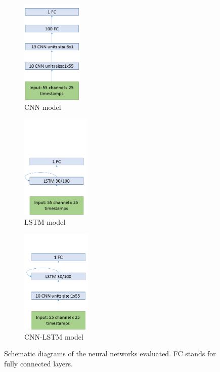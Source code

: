 \documentclass[
12pt, %
english, %
doublespacing, %
headsepline, %
]{MastersDoctoralThesis} %
\begin{document}
	\begin{figure}[t]
		\centering
		\begin{minipage}{.3\textwidth}
			\centering
			\begin{subfigure}{1.0\textwidth}
				\centering
				\includegraphics[height=5cm]{P300_CNN_arch}
				\caption{CNN model}
				\label{fig:CNN_model}
			\end{subfigure}
		\end{minipage}	
		\begin{minipage}{.3\textwidth}
			
			\centering
			\begin{subfigure}{1.0\textwidth}
				\centering
				\includegraphics[height=5cm]{P300_LSTM_arch_v3}
				\caption{LSTM model}
				\label{fig:LSTM_model}
			\end{subfigure}
			
		\end{minipage}%
		\begin{minipage}{.3\textwidth}
			\centering
			\begin{subfigure}{1.0\textwidth}
			\centering
			\includegraphics[height=5cm]{P300_LSTM_CNN_arch_v3}		
			\caption{CNN-LSTM model}
			\label{fig:LSTM_model_CNN}		
			\end{subfigure}
		\end{minipage}
		
		\caption{Schematic diagrams of the neural networks evaluated. FC stands for fully connected layers.}
	\end{figure}
	
\end{document}

